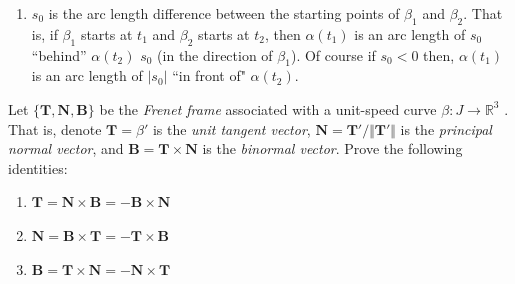 \documentclass[12 pt, letterpaper]{hmcpset}
\begin{document}
\begin{solution}
\begin{enumerate}
			In words, $\tau$ is an arc length function starting at $t_{0}$ and $h$ is its inverse. Thus, $\beta$ is an arc length parameterisation. 

			Now we know that when we have $\beta_{1}$ and $\beta_{2}$ as unit speed reparameterisations, they are defined by arc length parameterisations $\tau_{1}$ and $\tau_{2}$ with inverses $h_{1}$ and $h_{2}$. Since $\tau_{1}$ and $\tau_{2}$ are antiderivatives of the same function --- $\Vert \alpha' \Vert$, we have that $\tau_{2} = \tau_{1} - s_{0}$ for some $s_{0} \in \mathbb{R}$. 

			From this, we can get $h_{2}(s) = h_{1}(s + s_{0})$. Notice that for any $s \in J$ we have $s = \tau_{2}(t) = \tau_{1}(t) - s_{0}$. We can rewrite this as $\tau_{2}(t) = s$ and $\tau_{1}(t) = s + s_{0}$. Thus, taking $h_{1}$ and $h_{2}$ of both sides in the first and second equations respectively, we get
			\[
				h_{1}(s + s_{0}) = t = h_{2}(s)
			\]
			for any $s \in J$.
		\item $s_{0}$ is the arc length difference between the starting points of $\beta_{1}$ and $\beta_{2}$. That is, if $\beta_{1}$ starts at $t_{1}$ and $\beta_{2}$ starts at $t_{2}$, then $\alpha(t_{1})$ is an arc length of $s_{0}$ ``behind'' $\alpha(t_{2})$ $s_{0}$ (in the direction of $\beta_{1}$). Of course if $s_{0} < 0$ then, $\alpha(t_{1})$ is an arc length of $\vert s_{0} \vert$ ``in front of" $\alpha(t_{2})$.
	\end{enumerate}
\end{solution}

\pagebreak

\begin{problem}[Problem 5.]
	Let $\{ \mathbf{T}, \mathbf{N}, \mathbf{B} \}$  be the \textit{Frenet frame} associated with a unit-speed curve $\beta : J \to \mathbb{R}^{3}$ . That is, denote $\mathbf{T} = \beta'$  is the \textit{unit tangent vector}, $\mathbf{N} = \mathbf{T}'/\Vert \mathbf{T}' \Vert$  is the \textit{principal normal vector}, and $\mathbf{B} = \mathbf{T} \times \mathbf{N}$ is the \textit{binormal vector}. Prove the following identities:
	\begin{enumerate}
		\item $\mathbf{T} = \mathbf{N} \times \mathbf{B} = - \mathbf{B} \times \mathbf{N}$
		\item $\mathbf{N} = \mathbf{B} \times \mathbf{T} = - \mathbf{T} \times \mathbf{B}$
		\item $\mathbf{B} = \mathbf{T} \times \mathbf{N} = - \mathbf{N} \times \mathbf{T}$
	\end{enumerate}
\end{problem}
\end{document}
